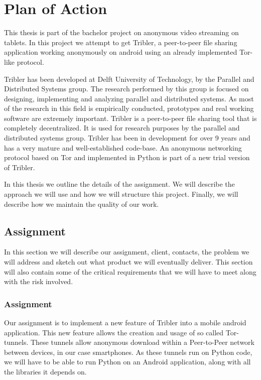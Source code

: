 \chapter{Plan of Action}

This thesis is part of the bachelor project on anonymous video streaming on tablets. In this project we attempt to get Tribler, a peer-to-peer file sharing application working anonymously on android using an already implemented Tor-like protocol.

Tribler has been developed at Delft University of Technology, by the Parallel and Distributed Systems group. The research performed by this group is focused on designing, implementing and analyzing parallel and distributed systems. As most of the research in this field is empirically conducted, prototypes and real working software are extremely important. Tribler is a peer-to-peer file sharing tool that is completely decentralized. It is used for research purposes by the parallel and distributed systems group. Tribler has been in development for over 9 years and has a very mature and well-established code-base. An anonymous networking protocol based on Tor and implemented in Python is part of a new trial version of Tribler.

In this thesis we outline the details of the assignment. We will describe the approach we will use and how we will structure this project. Finally, we will describe how we maintain the quality of our work.

\section{Assignment}
In this section we will describe our assignment, client, contacts, the problem we will address and sketch out what product we will eventually deliver. This section will also contain some of the critical requirements that we will have to meet along with the risk involved.

\subsection{Assignment}
Our assignment is to implement a new feature of Tribler into a mobile android application. This new feature allows the creation and usage of so called Tor-tunnels. These tunnels allow anonymous download within a Peer-to-Peer network between devices, in our case smartphones.
As these tunnels run on Python code, we will have to be able to run Python on an Android application, along with all the libraries it depends on.

